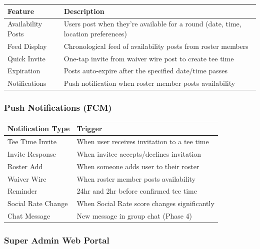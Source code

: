 \documentclass[11pt,a4paper]{article}
\begin{document}
\begin{tabularx}{\textwidth}{|p{3cm}|Y|}
\hline
{}
\textbf{Feature} & \textbf{Description} \\
\hline
Availability Posts & Users post when they're available for a round (date, time, location preferences) \\
\hline
Feed Display & Chronological feed of availability posts from roster members \\
\hline
Quick Invite & One-tap invite from waiver wire post to create tee time \\
\hline
Expiration & Posts auto-expire after the specified date/time passes \\
\hline
Notifications & Push notification when roster member posts availability \\
\hline
\end{tabularx}

\subsubsection{Push Notifications (FCM)}

\begin{tabularx}{\textwidth}{|p{4cm}|Y|}
\hline
{}
\textbf{Notification Type} & \textbf{Trigger} \\
\hline
Tee Time Invite & When user receives invitation to a tee time \\
\hline
Invite Response & When invitee accepts/declines invitation \\
\hline
Roster Add & When someone adds user to their roster \\
\hline
Waiver Wire & When roster member posts availability \\
\hline
Reminder & 24hr and 2hr before confirmed tee time \\
\hline
Social Rate Change & When Social Rate score changes significantly \\
\hline
Chat Message & New message in group chat (Phase 4) \\
\hline
\end{tabularx}

\subsubsection{Super Admin Web Portal}
\end{document}
